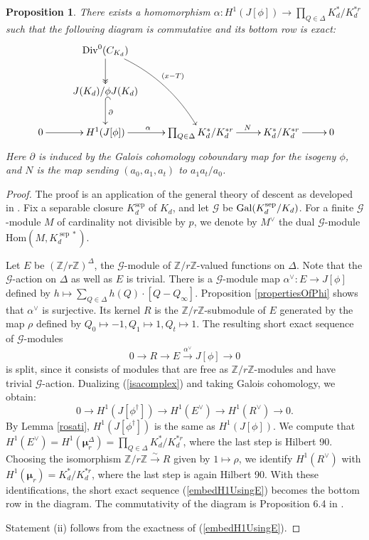 \documentclass[reqno]{amsart}
\newtheorem{proposition}[thm]{Proposition}
\theoremstyle{definition}
\theoremstyle{remark}
\newcommand{\Div}{\operatorname{Div}}
\newcommand{\sep}{\operatorname{sep}}
\newcommand{\XminusT}{(x-T)}
\newcommand{\GG}{\mathcal{G}}
\newcommand{\iso}{\stackrel{\sim}{\rightarrow}}
\def\bmu{{\boldsymbol\mu}}
\def\Gal{\textrm{\upshape Gal}}
\def\Z{\mathbb{Z}}
\def\Hom{\mathrm{Hom}}
\begin{document}
\begin{proposition}
\label{propertiesOfCC}
There exists a homomorphism $\alpha : H^1(J[\phi]) \rightarrow \prod_{Q \in \Delta} K_d^{\ast}/K_d^{\ast r}$ such that the following diagram is commutative and its bottom row is exact:
\[
\xymatrix{ 
& \Div^0(C_{K_d}) \ar@{->>}[d] \ar@/^1pc/[ddr]^{\XminusT}  \\\
& J(K_d)/\phi J(K_d) \ar@{^(->}[d]^{\partial} \\\
0 \ar[r] & H^1(J[\phi]) \ar[r]^{\alpha~~~} & \prod_{Q \in \Delta} K_d^{\ast}/K_d^{\ast r} \ar[r]^{~~~~N} & K_d^{\ast}/K_d^{\ast r} \ar[r] & 0
} 
\]
Here $\partial$ is induced by the Galois cohomology coboundary map for the isogeny $\phi$, and $N$ is the map sending $(a_0,a_1,a_t)$ to $a_1a_t/a_0$.
\end{proposition}
\begin{proof}
The proof is an application of the general theory of descent as developed in \cite{bps}. Fix a separable closure $K_d^{\sep}$ of $K_d$, and let $\GG$ be $\Gal(K_d^{\sep}/K_d)$. For a finite $\GG$-module $M$ of cardinality not divisible by $p$, we denote by $M^{\vee}$ the dual $\GG$-module $\Hom(M,K_d^{\sep \ast})$.

Let $E$ be $(\Z/r \Z )^{ \Delta }$, the $\GG$-module of $\Z/r\Z$-valued functions on $\Delta$. Note that the $\GG$-action on $\Delta$ as well as $E$ is trivial. There is a $\GG$-module map $\alpha^{\vee} : E \rightarrow J[\phi]$ 
defined by $h \mapsto \sum_{Q \in \Delta} h(Q) \cdot [Q - Q_{\infty}]$. Proposition \ref{propertiesOfPhi} shows that $\alpha^\vee$ is surjective. Its kernel $R$ is the $\Z/r\Z$-submodule of $E$ generated by the map $\rho$ defined by $Q_0 \mapsto -1, Q_1 \mapsto 1, Q_t \mapsto 1$.
The resulting short exact sequence of $\GG$-modules
\begin{equation}
\label{isacomplex}
0 \rightarrow R \rightarrow  E \stackrel{\alpha^\vee}{\rightarrow} J[\phi] \rightarrow 0
\end{equation}
is split, since it consists of modules that are free as $\Z/r\Z$-modules and have trivial $\GG$-action. Dualizing (\ref{isacomplex}) and taking Galois cohomology, we obtain:
\begin{equation}
\label{embedH1UsingE}
0 \rightarrow H^1(J[\phi^{\dagger}]) \rightarrow H^1(E^{\vee}) \rightarrow H^1(R^\vee) \rightarrow 0.
\end{equation}
By Lemma \ref{rosati}, $H^1(J[\phi^{\dagger}])$ is the same as $H^1(J[\phi])$. We compute that $H^1(E^{\vee}) = H^1(\bmu_r^\Delta) = \prod_{Q \in \Delta} K_d^{\ast}/K_d^{\ast r}$, where the last step is Hilbert 90. Choosing the isomorphism $\Z/r\Z \iso R$ given by $1 \mapsto \rho$, we identify $H^1(R^\vee)$ with $H^1(\bmu_r) = K_d^{\ast}/K_d^{\ast r}$, where the last step is again Hilbert 90. With these identifications, the short exact sequence (\ref{embedH1UsingE}) becomes the bottom row in the diagram. The commutativity of the diagram is Proposition 6.4 in \cite{bps}.

Statement (ii) follows from the exactness of (\ref{embedH1UsingE}).
\end{proof}
\end{document}
